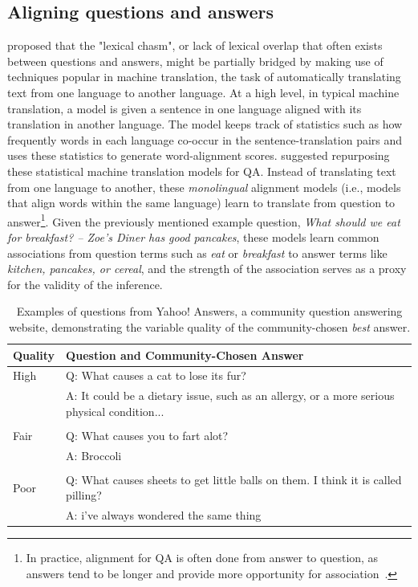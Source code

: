 \subsection{Aligning questions and answers}
\label{sec:intro_naacl2015}
\citet{Berger:00} proposed that the "lexical chasm", or lack of lexical overlap that often exists between questions and answers, might be partially bridged by making use of techniques popular in machine translation, the task of automatically translating text from one language to another language.  At a high level, in typical machine translation, a model is given a sentence in one language aligned with its translation in another language.  The model keeps track of statistics such as how frequently words in each language co-occur in the sentence-translation pairs and uses these statistics to generate word-alignment scores.  \citeauthor{Berger:00} suggested repurposing these statistical machine translation models for QA. Instead of translating text from one language to another, these \emph{monolingual} alignment models (i.e., models that align words within the same language) learn to translate from question to answer\footnote{In practice, alignment for QA is often done from answer to question, as answers tend to be longer and provide more opportunity for association~\citep{Surdeanu:11}.}.  Given the previously mentioned example question, {\em What should we eat for breakfast? -- Zoe's Diner has good pancakes}, these models learn common associations from question terms such as {\em eat} or {\em breakfast} to answer terms like {\em kitchen, pancakes, or cereal}, and the strength of the association serves as a proxy for the validity of the inference.

\begin{table}[t]
\begin{center}
\begin{tabularx}{0.8\linewidth}{p{1.5cm}p{10cm}}
\hline 
 Quality & Question and Community-Chosen Answer \\
 \hline
 High & Q: What causes a cat to lose its fur? \\
 		& A: It could be a dietary issue, such as an allergy, or a more serious physical condition...\\
 	&	\\
 Fair &  Q: What causes you to fart alot? \\
 		&	A: Broccoli	\\
 &		\\
 Poor	&	Q: What causes sheets to get little balls on them. I think it is called pilling? \\
 		 &  A: i've always wondered the same thing \\
\end{tabularx}
\caption{{  Examples of questions from Yahoo! Answers, a community question answering website, demonstrating the variable quality of the community-chosen \textit{best} answer. }}
\label{tab:cqa_quality}
\end{center}
\end{table}

